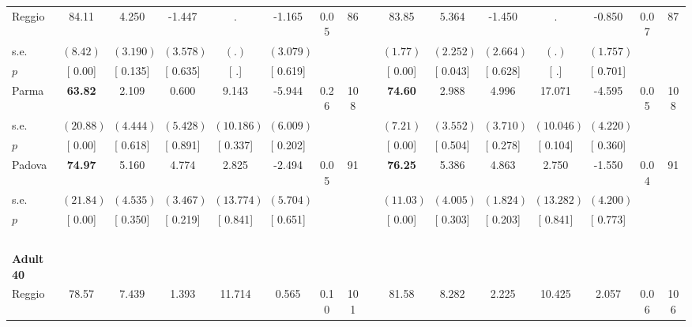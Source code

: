\begin{longtable}{L{8em} c c c c c c c p{1em} c c c c c c c}
\quad \quad \quad Reggio& 84.11 &     4.250 &    -1.447 &         . &    -1.165 &      0.05 &        86 & & 83.85 & $ \mathbf{    5.364}$ &    -1.450 &         . &    -0.850 &      0.07 &        87  \\*
\quad \quad \quad \quad s.e.& $ (     8.42)$ & $ (    3.190)$ & $ (    3.578)$ & $ (        .)$ & $ (    3.079)$ & & & & $ (     1.77)$ & $ (    2.252)$ & $ (    2.664)$ & $ (        .)$ & $ (    1.757)$ & &  \\*
\quad \quad \quad \quad $ p$ & [     0.00] & [    0.135] & [    0.635] & [        .] & [    0.619] & & & & [     0.00] & [    0.043] & [    0.628] & [        .] & [    0.701] & &  \\[1em]
\quad \quad \quad Parma& \textbf{    63.82} &     2.109 &     0.600 &     9.143 &    -5.944 &      0.26 &       108 & & \textbf{    74.60} &     2.988 &     4.996 &    17.071 &    -4.595 &      0.05 &       108  \\*
\quad \quad \quad \quad s.e.& $ (    20.88)$ & $ (    4.444)$ & $ (    5.428)$ & $ (   10.186)$ & $ (    6.009)$ & & & & $ (     7.21)$ & $ (    3.552)$ & $ (    3.710)$ & $ (   10.046)$ & $ (    4.220)$ & &  \\*
\quad \quad \quad \quad $ p$ & [     0.00] & [    0.618] & [    0.891] & [    0.337] & [    0.202] & & & & [     0.00] & [    0.504] & [    0.278] & [    0.104] & [    0.360] & &  \\[1em]
\quad \quad \quad Padova& \textbf{    74.97} &     5.160 &     4.774 &     2.825 &    -2.494 &      0.05 &        91 & & \textbf{    76.25} &     5.386 &     4.863 &     2.750 &    -1.550 &      0.04 &        91  \\*
\quad \quad \quad \quad s.e.& $ (    21.84)$ & $ (    4.535)$ & $ (    3.467)$ & $ (   13.774)$ & $ (    5.704)$ & & & & $ (    11.03)$ & $ (    4.005)$ & $ (    1.824)$ & $ (   13.282)$ & $ (    4.200)$ & &  \\*
\quad \quad \quad \quad $ p$ & [     0.00] & [    0.350] & [    0.219] & [    0.841] & [    0.651] & & & & [     0.00] & [    0.303] & [    0.203] & [    0.841] & [    0.773] & &  \\[1em]
~\\[1em]
\quad \quad \textbf{Adult 40} & & & & & & & & & & & & & & & \\* 
\quad \quad \quad Reggio& 78.57 & $ \mathbf{    7.439}$ &     1.393 &    11.714 &     0.565 &      0.10 &       101 & & 81.58 & $ \mathbf{    8.282}$ &     2.225 &    10.425 &     2.057 &      0.06 &       106  \\*

\end{longtable}

